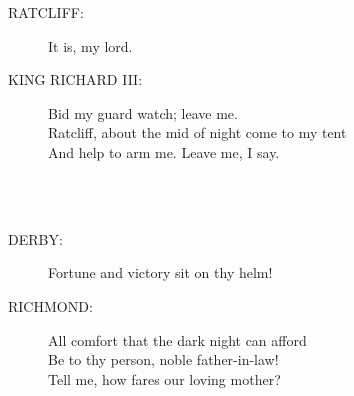 \documentclass{article}
\begin{document}
\begin{description}
\item[RATCLIFF:] 
\hspace{1pt}It is, my lord.\\
\end{description}
\begin{description}
\item[KING RICHARD III:] 
\hspace{1pt}Bid my guard watch; leave me.\\
\hspace{1pt}Ratcliff, about the mid of night come to my tent\\
\hspace{1pt}And help to arm me. Leave me, I say.\\
\end{description}
\\
\\
\begin{description}
\item[DERBY:] 
\hspace{1pt}Fortune and victory sit on thy helm!\\
\end{description}
\begin{description}
\item[RICHMOND:] 
\hspace{1pt}All comfort that the dark night can afford\\
\hspace{1pt}Be to thy person, noble father-in-law!\\
\hspace{1pt}Tell me, how fares our loving mother?\\
\end{description}
\end{document}
